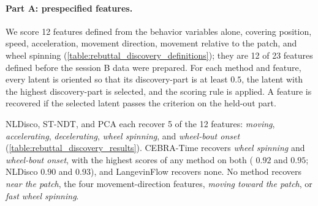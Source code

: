\paragraph{Part A: prespecified features.}
We score 12 features defined from the behavior variables alone, covering position, speed, acceleration, movement direction, movement relative to the patch, and wheel spinning (\autoref{table:rebuttal_discovery_definitions}); they are 12 of 23 features defined before the session B data were prepared. For each method and feature, every latent is oriented so that its discovery-part  is at least $0.5$, the latent with the highest discovery-part  is selected, and the scoring rule is applied. A feature is recovered if the selected latent passes the criterion on the held-out part.

NLDisco, ST-NDT, and PCA each recover 5 of the 12 features: \textit{moving}, \textit{accelerating}, \textit{decelerating}, \textit{wheel spinning}, and \textit{wheel-bout onset} (\autoref{table:rebuttal_discovery_results}). CEBRA-Time recovers \textit{wheel spinning} and \textit{wheel-bout onset}, with the highest scores of any method on both ( $0.92$ and $0.95$; NLDisco $0.90$ and $0.93$), and LangevinFlow recovers none. No method recovers \textit{near the patch}, the four movement-direction features, \textit{moving toward the patch}, or \textit{fast wheel spinning}.

\begin{table}[!htbp]
    \centering
    {\footnotesize\setlength{\tabcolsep}{2pt}\renewcommand{\arraystretch}{1.05}
    }
    \caption{\textbf{Part A feature definitions.} Each feature is a condition on the behavior at the last bin of a window, compared against all other windows of the stated set; a window enters only if its whole 20-bin span has valid samples of the variables involved. The median wheel speed is computed on the discovery part. A wheel bout is wheel speed above $0.05$ turns/s, with pauses shorter than $0.2$ s filled and bouts shorter than $0.4$ s removed. ``\%'' is the share of compared held-out windows in which the condition holds.}
    \label{table:rebuttal_discovery_definitions}
\end{table}


